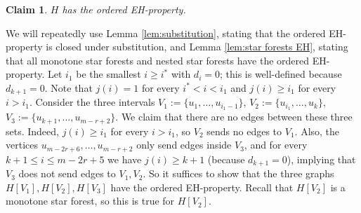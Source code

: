 \documentclass[11pt]{article}
\let\oldendproof\endproof
\renewenvironment{proof}[1][\proofname]{%
	\oldproof[\bf #1]%
}{\oldendproof}
\theoremstyle{plain}
\newtheorem{claim}[theorem]{Claim}
\begin{document}
\begin{proof}[Proof of Lemma \ref{r-graphs induction base case}]
\begin{claim}\label{building-H}
    $H$ has the ordered EH-property. 
\end{claim}
\begin{proof}
        We will repeatedly use Lemma \ref{lem:substitution}, stating that the ordered EH-property is closed under substitution, and Lemma \ref{lem:star forests EH}, stating that all monotone star forests and nested star forests have the ordered EH-property. 
        Let $i_1$ be the smallest $i \geq i^*$ with $d_i = 0$; this is well-defined because $d_{k+1} = 0$. Note that $j(i) = 1$ for every $i^* < i < i_1$ and $j(i) \geq i_1$ for every $i > i_1$.
        Consider the three intervals $V_1 := \{u_1,\dots,u_{i_1-1}\}$, 
        $V_2 := \{u_{i_1},\dots,u_{k}\}$, $V_3 := \{u_{k+1},\dots,u_{m-r+2}\}$. We claim that there are no edges between these three sets. 
        Indeed, $j(i) \geq i_1$ for every $i > i_1$, so $V_2$ sends no edges to $V_1$. 
        Also, the vertices $u_{m-2r+6},\dots,u_{m-r+2}$ only send edges inside $V_3$, and for every $k+1 \leq i \leq m-2r+5$ we have $j(i) \geq k+1$ (because $d_{k+1} = 0$), implying that $V_3$ does not send edges to $V_1,V_2$. 
        So it suffices to show that the three graphs $H[V_1],H[V_2],H[V_3]$ have the ordered EH-property. 
        Recall that $H[V_2]$ is a monotone star forest, so this is true for $H[V_2]$.


\end{proof}
\end{proof}
\end{document}
